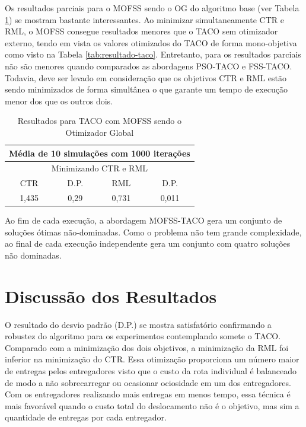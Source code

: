 Os resultados parciais para o MOFSS sendo o OG do algoritmo base (ver Tabela \ref{tab:resultado-mofss}) se mostram bastante interessantes. Ao minimizar simultaneamente CTR e RML, o MOFSS consegue resultados menores que o TACO sem otimizador externo, tendo em vista os valores otimizados do TACO de forma mono-objetiva como visto na Tabela \ref{tab:resultado-taco}. Entretanto, para os resultados parciais não são menores quando comparados as abordagens PSO-TACO e FSS-TACO. Todavia, deve ser levado em consideração que os objetivos CTR e RML estão sendo minimizados de forma simultânea o que garante um tempo de execução menor dos que os outros dois.

\begin{table}[htb]
    \centering
    \caption{Resultados para TACO com MOFSS sendo o Otimizador Global} \label{tab:resultado-mofss}
    \begin{tabular}{|c|c|c|c|}
    \hline
    \multicolumn{4}{|c|}{Média de 10 simulações com 1000 iterações} \\ \hline
    \multicolumn{4}{|c|}{Minimizando CTR e RML}                     \\ \hline
    CTR            & D.P.          & RML            & D.P.          \\ \hline
    1,435          & 0,29          & 0,731          & 0,011         \\ \hline
    \end{tabular}
    \end{table}

Ao fim de cada execução, a abordagem MOFSS-TACO gera um conjunto de soluções ótimas não-dominadas. Como o problema não tem grande complexidade, ao final de cada execução independente gera um conjunto com quatro soluções não dominadas.

\section{Discussão dos Resultados}

O resultado do desvio padrão (D.P.) se mostra satisfatório confirmando a robustez do algoritmo para os experimentos contemplando somete o TACO. Comparado com a minimização dos dois objetivos, a minimização da RML foi inferior na minimização do CTR. Essa otimização proporciona um número maior de entregas pelos entregadores visto que o custo da rota individual é balanceado de modo a não sobrecarregar ou ocasionar ociosidade em um dos entregadores. Com os entregadores realizando mais entregas em menos tempo, essa técnica é mais favorável quando o custo total do deslocamento não é o objetivo, mas sim a quantidade de entregas por cada entregador.

